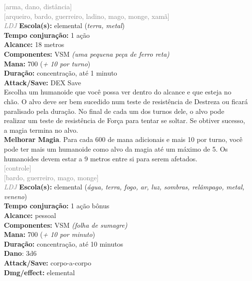 \documentclass{RPG_Adventure}[2021/10/20]
\begin{document}
{\scriptsize \textcolor{gray}{[arma, dano, distância]\\}}
{\scriptsize \textcolor{gray}{[arqueiro, bardo, guerreiro, ladino, mago, monge, xamã]\\}}
{\tiny \textcolor{gray}{\textit{LDJ}}}\jump{}
{\small \t \textbf{Escola(s):} elemental (\textit{terra, metal})\\\t \textbf{Tempo conjuração:} 1 ação\\\t \textbf{Alcance:} 18 metros\\\t \textbf{Componentes:} VSM \textit{(uma pequena peça de ferro reta)}\\\t \textbf{Mana:} 700 (\textit{+ 10 por turno})\\\t \textbf{Duração:} concentração, até 1 minuto\\\t \textbf{Attack/Save:} DEX Save\\}
{\normalsize Escolha um humanoide que você possa ver dentro do alcance e que esteja no chão. O alvo deve ser bem sucedido num teste de resistência de Destreza ou ficará paralisado pela duração. No final de cada um dos turnos dele, o alvo pode realizar um teste de resistência de Força para tentar se soltar. Se obtiver sucesso, a magia termina no alvo.\\\t \textbf{Melhorar Magia}. Para cada 600 de mana adicionais e mais 10 por turno, você pode ter mais um humanoide como alvo da magia até um máximo de 5. Os humanoides devem estar a 9 metros entre si para serem afetados.\\}
{\scriptsize \textcolor{gray}{[controle]\\}}
{\scriptsize \textcolor{gray}{[bardo, guerreiro, mago, monge]\\}}
{\tiny \textcolor{gray}{\textit{LDJ}}}\jump{}
{\small \t \textbf{Escola(s):} elemental (\textit{água, terra, fogo, ar, luz, sombras, relâmpago, metal, veneno})\\\t \textbf{Tempo conjuração:} 1 ação bônus\\\t \textbf{Alcance:} pessoal\\\t \textbf{Componentes:} VSM \textit{(folha de sumagre)}\\\t \textbf{Mana:} 700 (\textit{+ 10 por minuto})\\\t \textbf{Duração:} concentração, até 10 minutos\\\t \textbf{Dano}: 3d6\\\t \textbf{Attack/Save:} corpo-a-corpo\\\t \textbf{Dmg/effect:} elemental\\}
\end{document}

